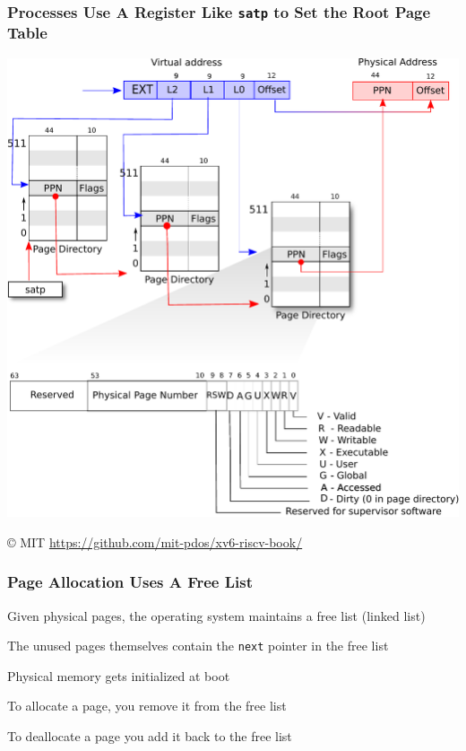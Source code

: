   \begin{frame}
    \frametitle{Processes Use A Register Like \texttt{satp} to Set the Root Page Table}

    \begin{center}
      \includegraphics[scale=0.5, clip, trim=0cm 8cm 0cm 0cm]{riscv_pagetable.pdf}
    \end{center}

    © MIT \url{https://github.com/mit-pdos/xv6-riscv-book/}
  \end{frame}

  \begin{frame}
    \frametitle{Page Allocation Uses A Free List}

    Given physical pages, the operating system maintains a free list (linked list)

    \vspace{2em}

    The unused pages themselves contain the \texttt{next} pointer in the free list

    \hspace{2em} Physical memory gets initialized at boot

    \vspace{2em}

    To allocate a page, you remove it from the free list

    \hspace{2em} To deallocate a page you add it back to the free list
  \end{frame}

